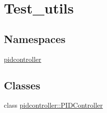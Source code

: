 \hypertarget{group__test__utils}{}\section{Test\+\_\+utils}
\label{group__test__utils}
\subsection*{Namespaces}
\begin{DoxyCompactItemize}
\item 
 \mbox{\hyperlink{namespacepidcontroller}{pidcontroller}}
\end{DoxyCompactItemize}
\subsection*{Classes}
\begin{DoxyCompactItemize}
\item 
class \mbox{\hyperlink{classpidcontroller_1_1PIDController}{pidcontroller\+::\+P\+I\+D\+Controller}}
\end{DoxyCompactItemize}

